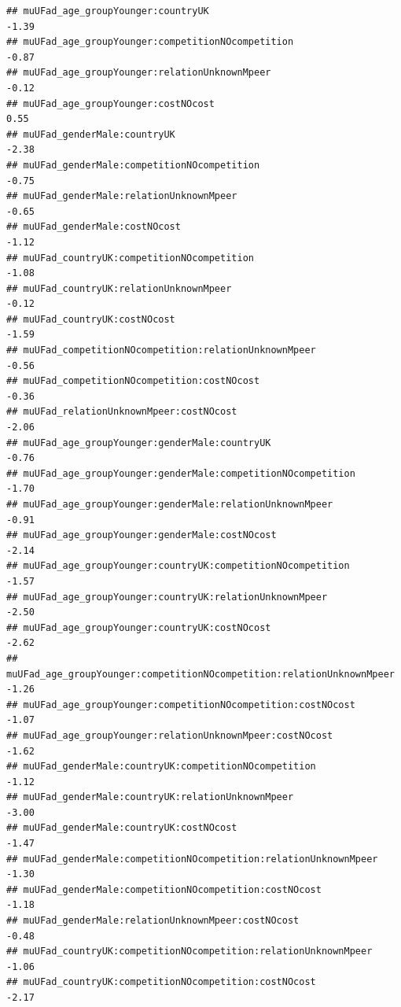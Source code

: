 \documentclass[
]{article}
\begin{document}
\begin{verbatim}
## muUFad_age_groupYounger:countryUK                                         -1.39
## muUFad_age_groupYounger:competitionNOcompetition                          -0.87
## muUFad_age_groupYounger:relationUnknownMpeer                              -0.12
## muUFad_age_groupYounger:costNOcost                                         0.55
## muUFad_genderMale:countryUK                                               -2.38
## muUFad_genderMale:competitionNOcompetition                                -0.75
## muUFad_genderMale:relationUnknownMpeer                                    -0.65
## muUFad_genderMale:costNOcost                                              -1.12
## muUFad_countryUK:competitionNOcompetition                                 -1.08
## muUFad_countryUK:relationUnknownMpeer                                     -0.12
## muUFad_countryUK:costNOcost                                               -1.59
## muUFad_competitionNOcompetition:relationUnknownMpeer                      -0.56
## muUFad_competitionNOcompetition:costNOcost                                -0.36
## muUFad_relationUnknownMpeer:costNOcost                                    -2.06
## muUFad_age_groupYounger:genderMale:countryUK                              -0.76
## muUFad_age_groupYounger:genderMale:competitionNOcompetition               -1.70
## muUFad_age_groupYounger:genderMale:relationUnknownMpeer                   -0.91
## muUFad_age_groupYounger:genderMale:costNOcost                             -2.14
## muUFad_age_groupYounger:countryUK:competitionNOcompetition                -1.57
## muUFad_age_groupYounger:countryUK:relationUnknownMpeer                    -2.50
## muUFad_age_groupYounger:countryUK:costNOcost                              -2.62
## muUFad_age_groupYounger:competitionNOcompetition:relationUnknownMpeer     -1.26
## muUFad_age_groupYounger:competitionNOcompetition:costNOcost               -1.07
## muUFad_age_groupYounger:relationUnknownMpeer:costNOcost                   -1.62
## muUFad_genderMale:countryUK:competitionNOcompetition                      -1.12
## muUFad_genderMale:countryUK:relationUnknownMpeer                          -3.00
## muUFad_genderMale:countryUK:costNOcost                                    -1.47
## muUFad_genderMale:competitionNOcompetition:relationUnknownMpeer           -1.30
## muUFad_genderMale:competitionNOcompetition:costNOcost                     -1.18
## muUFad_genderMale:relationUnknownMpeer:costNOcost                         -0.48
## muUFad_countryUK:competitionNOcompetition:relationUnknownMpeer            -1.06
## muUFad_countryUK:competitionNOcompetition:costNOcost                      -2.17

\end{verbatim}
\end{document}
